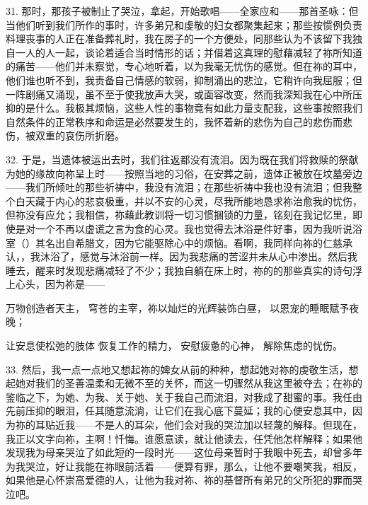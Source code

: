 31. 那时，那孩子被制止了哭泣，拿起，开始歌唱——全家应和——那首圣咏：但当他们听到我们所作的事时，许多弟兄和虔敬的妇女都聚集起来；那些按惯例负责料理丧事的人正在准备葬礼时，我在房子的一个方便处，同那些认为不该留下我独自一人的人一起，谈论着适合当时情形的话；并借着这真理的慰藉减轻了祢所知道的痛苦——他们并未察觉，专心地听着，以为我毫无忧伤的感觉。但在祢的耳中，他们谁也听不到，我责备自己情感的软弱，抑制涌出的悲泣，它稍许向我屈服；但一阵剧痛又涌现，虽不至于使我放声大哭，或面容改变，然而我深知我在心中所压抑的是什么。我极其烦恼，这些人性的事物竟有如此力量支配我，这些事按照我们自然条件的正常秩序和命运是必然要发生的，我怀着新的悲伤为自己的悲伤而悲伤，被双重的哀伤所折磨。\par

32. 于是，当遗体被运出去时，我们往返都没有流泪。因为既在我们将救赎的祭献为她的缘故向祢呈上时——按照当地的习俗，在安葬之前，遗体正被放在坟墓旁边——我们所倾吐的那些祈祷中，我没有流泪；在那些祈祷中我也没有流泪；但我整个白天藏于内心的悲哀极重，并以不安的心灵，尽我所能地恳求祢治愈我的忧伤，但祢没有应允；我相信，祢藉此教训将一切习惯捆锁的力量，铭刻在我记忆里，即使是对一个不再以虚谎之言为食的心灵。我也觉得去沐浴是件好事，因为我听说浴室（）其名出自希腊文，因为它能驱除心中的烦恼。看啊，我同样向祢的仁慈承认，，我沐浴了，感觉与沐浴前一样。因为我悲痛的苦涩并未从心中渗出。然后我睡去，醒来时发现悲痛减轻了不少；我独自躺在床上时，祢的的那些真实的诗句浮上心头，因为祢是——\par

万物创造者天主，\newline{} 穹苍的主宰，祢以灿烂的光辉装饰白昼，\newline{} 以恩宠的睡眠赋予夜晚；\newline{}\par

让安息使松弛的肢体\newline{} 恢复工作的精力，\newline{} 安慰疲惫的心神，\newline{} 解除焦虑的忧伤。\newline{}\par

33. 然后，我一点一点地又想起祢的婢女从前的种种，想起她对祢的虔敬生活，想起她对我们的圣善温柔和无微不至的关怀，而这一切骤然从我这里被夺去；在祢的鉴临之下，为她、为我、关于她、关于我自己而流泪，对我成了甜蜜的事。我任由先前压抑的眼泪，任其随意流淌，让它们在我心底下蔓延；我的心便安息其中，因为祢的耳贴近我——不是人的耳朵，他们会对我的哭泣加以轻蔑的解释。但现在，我正以文字向祢，主啊！忏悔。谁愿意读，就让他读去，任凭他怎样解释；如果他发现我为母亲哭泣了如此短的一段时光——这位母亲暂时于我眼中死去，却曾多年为我哭泣，好让我能在祢眼前活着——便算有罪，那么，让他不要嘲笑我，相反，如果他是心怀崇高爱德的人，让他为我对祢、祢的基督所有弟兄的父所犯的罪而哭泣吧。\par

